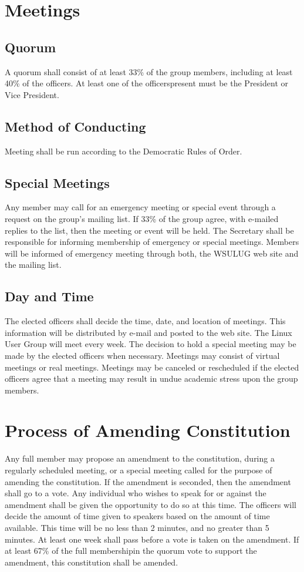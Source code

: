 \documentclass{article}
\begin{document}
\section{Meetings}
\subsection{Quorum}
A quorum shall consist of at least 33\% of the group members, including at least 40\% of the officers.  At least one of the officerspresent must be the President or Vice President.
\subsection{Method of Conducting}
Meeting shall be run according to the Democratic Rules of Order.
\subsection{Special Meetings}
Any member may call for an emergency meeting or special event through a request on the group's mailing list.  If 33\% of the group agree, with e-mailed replies to the list, then the meeting or event will be held. The Secretary shall be responsible for informing membership of emergency or special meetings. Members will be informed of emergency meeting through both, the WSULUG web site and the mailing list.
\subsection{Day and Time}
The elected officers shall decide the time, date, and location of meetings. This information will be distributed by e-mail and posted to the web site. The Linux User Group will meet every week.  The decision to hold a special meeting may be made by the elected officers when necessary. Meetings may consist of virtual meetings or real meetings. Meetings may be canceled or rescheduled if the elected officers agree that a meeting may result in undue academic stress upon the group members.

\section{Process of Amending Constitution}
Any full member may propose an amendment to the constitution, during a regularly scheduled meeting, or a special meeting called for the purpose of amending the constitution. If the amendment is seconded, then the amendment shall go to a vote. Any individual who wishes to speak for or against the amendment shall be given the opportunity to do so at this time. The officers will decide the amount of time given to speakers based on the amount of time available. This time will be no less than 2 minutes, and no greater than 5 minutes. At least one week shall pass before a vote is taken on the amendment. If at least 67\% of the full membershipin the quorum vote to support the amendment, this constitution shall be amended.
\end{document}
